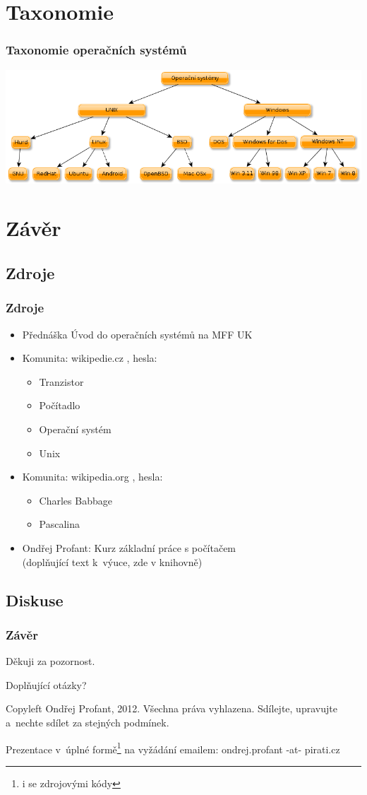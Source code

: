 \documentclass[xetex]{beamer}
\begin{document}
\section{Taxonomie}
\begin{frame}
 \frametitle{Taxonomie operačních systémů}
 \includegraphics[scale=0.39]{pic/os.png}
\end{frame}

\section{Závěr}
\subsection{Zdroje}
\begin{frame}
 \frametitle{Zdroje}
 \begin{itemize}
 \item Přednáška Úvod do operačních systémů na MFF UK
 \item Komunita: wikipedie.cz , hesla:
 \begin{itemize}
  \item Tranzistor
  \item Počítadlo
  \item Operační systém
  \item Unix
 \end{itemize}
 \item Komunita: wikipedia.org , hesla:
 \begin{itemize}
 \item Charles Babbage
 \item Pascalina
 \end{itemize}
 \item Ondřej Profant: Kurz základní práce s počítačem\\ (doplňující text k~výuce, zde v knihovně)
 \end{itemize}
\end{frame}
\subsection{Diskuse}
\begin{frame}
  \frametitle{Závěr}
	Děkuji za pozornost.

	\bigskip
	
	Doplňující otázky?

\bigskip

\bigskip

\scriptsize
Copyleft Ondřej Profant, 2012. Všechna práva vyhlazena. Sdílejte, upravujte a~nechte sdílet za stejných podmínek. 

Prezentace v~úplné formě\footnote{i se zdrojovými kódy} na vyžádání emailem: ondrej.profant -at- pirati.cz 
\end{frame}
\end{document}
